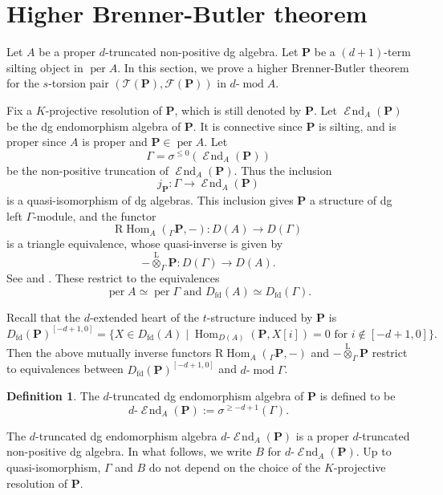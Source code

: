 \documentclass[11pt,a4paper,reqno]{amsart}
\theoremstyle{plain}
\numberwithin{equation}{section}
\theoremstyle{definition}
\newtheorem{definition}[theorem]{Definition}
\providecommand{\per}{\operatorname{per}}
\renewcommand{\mod}{\operatorname{mod}}
\newcommand{\Hom}{\operatorname{Hom}}
\newcommand{\RHom}{\mathrm R\!\Hom}
\newcommand{\Lotimes}{\overset{\mathrm L}{\otimes}}
\DeclareMathOperator{\huaEnd}{\mathcal{E}\!nd}
\newcommand{\emod}[2]{#1\text{-}\!\mod #2}
\newcommand{\eheart}[2]{#2^{[-#1+1,0]}}
\newcommand{\eend}[2]{#1\text{-}\huaEnd_{#2}}
\newcommand{\PP}{\mathbf{P}}
\newcommand{\T}{\mathcal{T}}
\newcommand{\F}{\mathcal{F}}
\begin{document}
\section{Higher Brenner-Butler theorem}\label{sec:higherBB}

Let $A$ be a proper $d$-truncated non-positive dg algebra. Let $\PP$ be a $(d+1)$-term silting object in $\per A$. In this section, we prove a higher Brenner-Butler theorem for the $s$-torsion pair $(\T(\PP),\F(\PP))$ in $\emod{d}{A}$.

Fix a $K$-projective resolution of $\PP$, which is still denoted by $\PP$. Let $\huaEnd_A(\PP)$ be the dg endomorphism algebra of $\PP$. It is connective since $\PP$ is silting, and is proper since $A$ is proper and $\PP\in\per A$. Let
\[\Gamma=\sigma^{\leq 0}(\huaEnd_A(\PP))\]
be the non-positive truncation of $\huaEnd_A(\PP)$. Thus the inclusion
\[
 j_{\PP}\colon\Gamma\rightarrow\huaEnd_A(\PP)
\]
is a quasi-isomorphism of dg algebras. This inclusion gives $\PP$ a structure of dg left $\Gamma$-module, and the functor
\[
 \RHom_A({}_{\Gamma}\PP,-)\colon D(A)\to D(\Gamma)
\]
is a triangle equivalence, whose quasi-inverse is given by
\[
 -\Lotimes_{\Gamma}\PP\colon D(\Gamma)\to D(A).
\]
See \cite[Lemma~6.1(a)]{Ke1} and \cite[Lemma~3.10]{Ke2}. These restrict to the equivalences
\[\per A\simeq\per \Gamma\text{ and }D_{\mathrm{fd}}(A)\simeq D_{\mathrm{fd}}(\Gamma).\]

Recall that the $d$-extended heart of the $t$-structure induced by $\PP$ is
\[
 \eheart{d}{D_{\mathrm{fd}}(\PP)}
 =\{X\in D_{\mathrm{fd}}(A)\mid
     \Hom_{D(A)}(\PP,X[i])=0\text{ for }i\notin[-d+1,0]\}.
\]
Then the above mutually inverse functors $\RHom_A({}_{\Gamma}\PP,-)$ and $-\Lotimes_{\Gamma}\PP$ restrict to equivalences between $\eheart{d}{D_{\mathrm{fd}}(\PP)}$ and $\emod{d}{\Gamma}$.

\begin{definition}
  The $d$-truncated dg endomorphism algebra of $\PP$ is defined to be
  \[\eend{d}{A}(\PP):=\sigma^{\geq -d+1}(\Gamma).\]
\end{definition}

The $d$-truncated dg endomorphism algebra $\eend{d}{A}(\PP)$ is a proper $d$-truncated non-positive dg algebra. In what follows, we write $B$ for $\eend{d}{A}(\PP)$. Up to quasi-isomorphism, $\Gamma$ and $B$ do not depend on the choice of the $K$-projective resolution of $\PP$.
\end{document}
